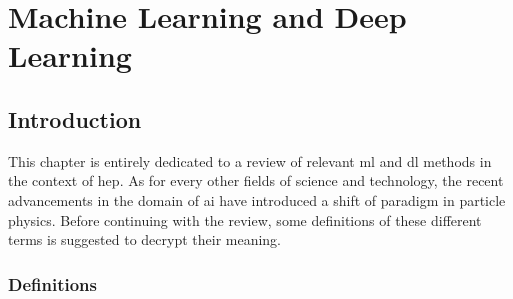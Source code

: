\chapter{Machine Learning and Deep Learning}

\section{Introduction}
This chapter is entirely dedicated to a review of relevant \gls{ml} and \gls{dl} methods in the context of \gls{hep}. As for every other fields of science and technology, the recent advancements in the domain of \gls{ai} have introduced a shift of paradigm in particle physics. Before continuing with the review, some definitions of these different terms is suggested to decrypt their meaning.

\subsection{Definitions}
